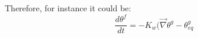 Therefore, for instance it could be:
\begin{equation}
\frac{d \theta^f}{dt} = - K_w (\vec{\nabla}{\theta^g - \theta^g_{eq}}
\end{equation}